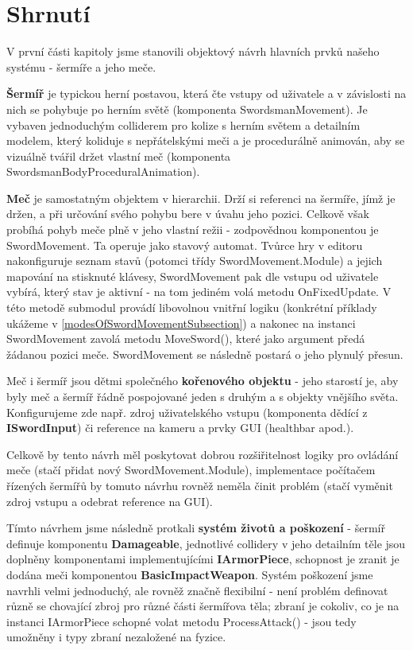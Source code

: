 \section{Shrnutí}

V první části kapitoly jsme stanovili objektový návrh hlavních prvků našeho systému - šermíře a jeho meče. 

\textbf{Šermíř} je typickou herní postavou, která čte vstupy od uživatele a v závislosti na nich se pohybuje po herním světě (komponenta SwordsmanMovement). Je vybaven jednoduchým colliderem pro kolize s herním světem a detailním modelem, který koliduje s nepřátelskými meči a je procedurálně animován, aby se vizuálně tvářil držet vlastní meč (komponenta SwordsmanBodyProceduralAnimation). 

\textbf{Meč} je samostatným objektem v hierarchii. Drží si referenci na šermíře, jímž je držen, a při určování svého pohybu bere v úvahu jeho pozici. Celkově však probíhá pohyb meče plně v jeho vlastní režii - zodpovědnou komponentou je SwordMovement. Ta operuje jako stavový automat. Tvůrce hry v editoru nakonfiguruje seznam stavů (potomci třídy SwordMovement.Module) a jejich mapování na stisknuté klávesy, SwordMovement pak dle vstupu od uživatele vybírá, který stav je aktivní - na tom jediném volá metodu OnFixedUpdate. V této metodě submodul provádí libovolnou vnitřní logiku (konkrétní příklady ukážeme v \ref{modesOfSwordMovementSubsection}) a nakonec na instanci SwordMovement zavolá metodu MoveSword(), které jako argument předá žádanou pozici meče. SwordMovement se následně postará o jeho plynulý přesun. 

Meč i šermíř jsou dětmi společného \textbf{kořenového objektu} - jeho starostí je, aby byly meč a šermíř řádně pospojované jeden s druhým a s objekty vnějšího světa. Konfigurujeme zde např. zdroj uživatelského vstupu (komponenta dědící z \textbf{ISwordInput}) či reference na kameru a prvky GUI (healthbar apod.).

Celkově by tento návrh měl poskytovat dobrou rozšiřitelnost logiky pro ovládání meče (stačí přidat nový SwordMovement.Module), implementace počítačem řízených šermířů by tomuto návrhu rovněž neměla činit problém (stačí vyměnit zdroj vstupu a odebrat reference na GUI).

Tímto návrhem jsme následně protkali \textbf{systém životů a poškození} - šermíř definuje komponentu \textbf{Damageable}, jednotlivé collidery v jeho detailním těle jsou doplněny komponentami implementujícími \textbf{IArmorPiece}, schopnost je zranit je dodána meči komponentou \textbf{BasicImpactWeapon}. Systém poškození jsme navrhli velmi jednoduchý, ale rovněž značně flexibilní - není problém definovat různě se chovající zbroj pro různé části šermířova těla; zbraní je cokoliv, co je na instanci IArmorPiece schopné volat metodu ProcessAttack() - jsou tedy umožněny i typy zbraní nezaložené na fyzice.

